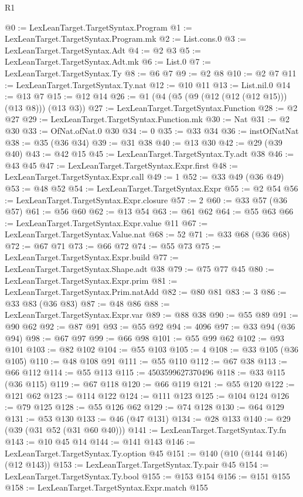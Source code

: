 \begin{lexlean}{R1}
\begin{coremodule}
@0 := LexLeanTarget.TargetSyntax.Program
@1 := LexLeanTarget.TargetSyntax.Program.mk
@2 := List.cons.{0}
@3 := LexLeanTarget.TargetSyntax.Adt
@4 := @2 @3
@5 := LexLeanTarget.TargetSyntax.Adt.mk
@6 := List.{0}
@7 := LexLeanTarget.TargetSyntax.Ty
@8 := @6 @7
@9 := @2 @8
@10 := @2 @7
@11 := LexLeanTarget.TargetSyntax.Ty.nat
@12 := @10 @11
@13 := List.nil.{0}
@14 := @13 @7
@15 := @12 @14
@26 := @1 (@4 (@5 (@9 (@12 (@12 (@12 @15))) (@13 @8))) (@13 @3))
@27 := LexLeanTarget.TargetSyntax.Function
@28 := @2 @27
@29 := LexLeanTarget.TargetSyntax.Function.mk
@30 := Nat
@31 := @2 @30
@33 := OfNat.ofNat.{0} @30
@34 := 0
@35 := @33 @34
@36 := instOfNatNat
@38 := @35 (@36 @34)
@39 := @31 @38
@40 := @13 @30
@42 := @29 (@39 @40)
@43 := @42 @15
@45 := LexLeanTarget.TargetSyntax.Ty.adt @38
@46 := @43 @45
@47 := LexLeanTarget.TargetSyntax.Expr.first
@48 := LexLeanTarget.TargetSyntax.Expr.call
@49 := 1
@52 := @33 @49 (@36 @49)
@53 := @48 @52
@54 := LexLeanTarget.TargetSyntax.Expr
@55 := @2 @54
@56 := LexLeanTarget.TargetSyntax.Expr.closure
@57 := 2
@60 := @33 @57 (@36 @57)
@61 := @56 @60
@62 := @13 @54
@63 := @61 @62
@64 := @55 @63
@66 := LexLeanTarget.TargetSyntax.Expr.value @11
@67 := LexLeanTarget.TargetSyntax.Value.nat
@68 := 52
@71 := @33 @68 (@36 @68)
@72 := @67 @71
@73 := @66 @72
@74 := @55 @73
@75 := LexLeanTarget.TargetSyntax.Expr.build
@77 := LexLeanTarget.TargetSyntax.Shape.adt @38
@79 := @75 @77 @45
@80 := LexLeanTarget.TargetSyntax.Expr.prim
@81 := LexLeanTarget.TargetSyntax.Prim.natAdd
@82 := @80 @81
@83 := 3
@86 := @33 @83 (@36 @83)
@87 := @48 @86
@88 := LexLeanTarget.TargetSyntax.Expr.var
@89 := @88 @38
@90 := @55 @89
@91 := @90 @62
@92 := @87 @91
@93 := @55 @92
@94 := 4096
@97 := @33 @94 (@36 @94)
@98 := @67 @97
@99 := @66 @98
@101 := @55 @99 @62
@102 := @93 @101
@103 := @82 @102
@104 := @55 @103
@105 := 4
@108 := @33 @105 (@36 @105)
@110 := @48 @108 @91
@111 := @55 @110
@112 := @67 @38
@113 := @66 @112
@114 := @55 @113
@115 := 4503599627370496
@118 := @33 @115 (@36 @115)
@119 := @67 @118
@120 := @66 @119
@121 := @55 @120
@122 := @121 @62
@123 := @114 @122
@124 := @111 @123
@125 := @104 @124
@126 := @79 @125
@128 := @55 @126 @62
@129 := @74 @128
@130 := @64 @129
@131 := @53 @130
@133 := @46 (@47 @131)
@134 := @28 @133
@140 := @29 (@39 (@31 @52 (@31 @60 @40)))
@141 := LexLeanTarget.TargetSyntax.Ty.fn
@143 := @10 @45 @14
@144 := @141 @143
@146 := LexLeanTarget.TargetSyntax.Ty.option @45
@151 := @140 (@10 (@144 @146) (@12 @143))
@153 := LexLeanTarget.TargetSyntax.Ty.pair @45
@154 := LexLeanTarget.TargetSyntax.Ty.bool
@155 := @153 @154
@156 := @151 @155
@158 := LexLeanTarget.TargetSyntax.Expr.match @155

\end{coremodule}
\end{lexlean}
